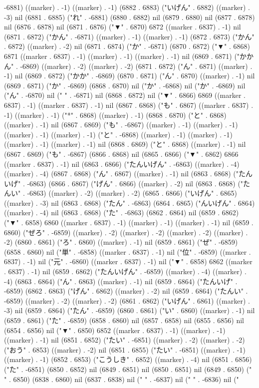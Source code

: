 -6881) ((marker) . -1) ((marker) . -1) (6882 . 6883) ("いげん" . 6882) ((marker) . -3) nil (6881 . 6885) ("れ" . -6881) (6880 . 6882) nil (6879 . 6880) nil (6877 . 6878) nil (6876 . 6878) nil (6871 . 6876) ("▼" . 6870) 6872 ((marker . 6837) . -1) nil (6871 . 6872) ("かん" . -6871) ((marker) . -1) ((marker) . -1) (6872 . 6873) ("かん" . 6872) ((marker) . -2) nil (6871 . 6874) ("か" . -6871) (6870 . 6872) ("▼" . 6868) 6871 ((marker . 6837) . -1) ((marker) . -1) ((marker) . -1) nil (6869 . 6871) ("かかん" . -6869) ((marker) . -2) ((marker) . -2) (6871 . 6872) ("ん" . 6871) ((marker) . -1) nil (6869 . 6872) ("かか" . -6869) (6870 . 6871) ("ん" . 6870) ((marker) . -1) nil (6869 . 6871) ("か" . -6869) (6868 . 6870) nil ("か" . -6868) nil ("か" . -6869) nil ("ん" . -6870) nil (" " . -6871) nil (6868 . 6872) nil ("▼" . 6866) 6869 ((marker . 6837) . -1) ((marker . 6837) . -1) nil (6867 . 6868) ("も" . 6867) ((marker . 6837) . -1) ((marker) . -1) ("*" . 6868) ((marker) . -1) (6868 . 6870) ("と" . 6868) ((marker) . -1) nil (6867 . 6869) ("も" . -6867) ((marker) . -1) ((marker) . -1) ((marker) . -1) ((marker) . -1) ("と" . -6868) ((marker) . -1) ((marker) . -1) ((marker) . -1) ((marker) . -1) nil (6868 . 6869) ("と" . 6868) ((marker) . -1) nil (6867 . 6869) ("も" . -6867) (6866 . 6868) nil (6865 . 6866) ("▼" . 6862) 6866 ((marker . 6837) . -1) nil (6863 . 6866) ("たんいげん" . -6863) ((marker) . -4) ((marker) . -4) (6867 . 6868) ("ん" . 6867) ((marker) . -1) nil (6863 . 6868) ("たんいげ" . -6863) (6866 . 6867) ("げん" . 6866) ((marker) . -2) nil (6863 . 6868) ("たんい" . -6863) ((marker) . -2) ((marker) . -2) (6865 . 6866) ("いげん" . 6865) ((marker) . -3) nil (6863 . 6868) ("たん" . -6863) (6864 . 6865) ("んいげん" . 6864) ((marker) . -4) nil (6863 . 6868) ("た" . -6863) (6862 . 6864) nil (6859 . 6862) ("▼" . 6858) 6860 ((marker . 6837) . -1) ((marker) . -1) ((marker) . -1) nil (6859 . 6860) ("ぜろ" . -6859) ((marker) . -2) ((marker) . -2) ((marker) . -2) ((marker) . -2) (6860 . 6861) ("ろ" . 6860) ((marker) . -1) nil (6859 . 6861) ("ぜ" . -6859) (6858 . 6860) nil ("単" . -6858) ((marker . 6837) . -1) nil ("位" . -6859) ((marker . 6837) . -1) nil ("元" . -6860) ((marker . 6837) . -1) nil ("▼" . 6858) 6862 ((marker . 6837) . -1) nil (6859 . 6862) ("たんいげん" . -6859) ((marker) . -4) ((marker) . -4) (6863 . 6864) ("ん" . 6863) ((marker) . -1) nil (6859 . 6864) ("たんいげ" . -6859) (6862 . 6863) ("げん" . 6862) ((marker) . -2) nil (6859 . 6864) ("たんい" . -6859) ((marker) . -2) ((marker) . -2) (6861 . 6862) ("いげん" . 6861) ((marker) . -3) nil (6859 . 6864) ("たん" . -6859) (6860 . 6861) ("い" . 6860) ((marker) . -1) nil (6859 . 6861) ("た" . -6859) (6858 . 6860) nil (6857 . 6858) nil (6855 . 6856) nil (6854 . 6856) nil ("▼" . 6850) 6852 ((marker . 6837) . -1) ((marker) . -1) ((marker) . -1) nil (6851 . 6852) ("たい" . -6851) ((marker) . -2) ((marker) . -2) ("おう" . 6853) ((marker) . -2) nil (6851 . 6855) ("たい" . -6851) ((marker) . -1) ((marker) . -1) (6852 . 6853) ("こうしき" . 6852) ((marker) . -4) nil (6851 . 6856) ("た" . -6851) (6850 . 6852) nil (6849 . 6851) nil (6850 . 6851) nil (6849 . 6850) (" " . 6850) (6838 . 6860) nil (6837 . 6838) nil (" " . -6837) nil (" " . -6836) nil ("
